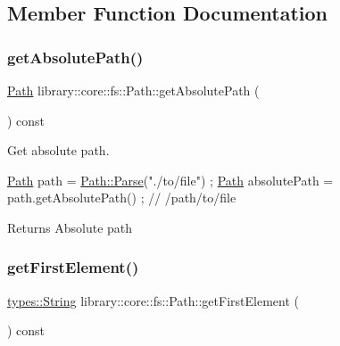\subsection{Member Function Documentation}
\mbox{\label{classlibrary_1_1core_1_1fs_1_1_path_a09dc880115d1e0a9079ac8e106e82c92}} 
\subsubsection{\texorpdfstring{get\+Absolute\+Path()}{getAbsolutePath()}}
{\footnotesize\ttfamily \hyperlink{classlibrary_1_1core_1_1fs_1_1_path}{Path} library\+::core\+::fs\+::\+Path\+::get\+Absolute\+Path (\begin{DoxyParamCaption}{ }\end{DoxyParamCaption}) const}



Get absolute path. 


\begin{DoxyCode}
\hyperlink{classlibrary_1_1core_1_1fs_1_1_path_aaba9a8e0153813f08f78f1c3275734a4}{Path} path = \hyperlink{classlibrary_1_1core_1_1fs_1_1_path_aebf5bd3af83e0b7376616e146f3e55df}{Path::Parse}(\textcolor{stringliteral}{"./to/file"}) ;
\hyperlink{classlibrary_1_1core_1_1fs_1_1_path_aaba9a8e0153813f08f78f1c3275734a4}{Path} absolutePath = path.getAbsolutePath() ; \textcolor{comment}{// /path/to/file}
\end{DoxyCode}


\begin{DoxyReturn}{Returns}
Absolute path 
\end{DoxyReturn}
\mbox{\label{classlibrary_1_1core_1_1fs_1_1_path_a431c7842c8a0d5fc314b676a8487e5af}} 
\subsubsection{\texorpdfstring{get\+First\+Element()}{getFirstElement()}}
{\footnotesize\ttfamily \hyperlink{classlibrary_1_1core_1_1types_1_1_string}{types\+::\+String} library\+::core\+::fs\+::\+Path\+::get\+First\+Element (\begin{DoxyParamCaption}{ }\end{DoxyParamCaption}) const}



